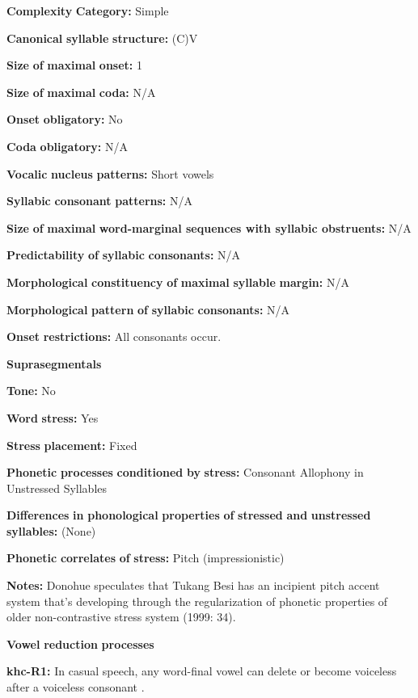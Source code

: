 \begin{styleBody}
\textbf{Complexity} \textbf{Category:} Simple

\textbf{Canonical} \textbf{syllable} \textbf{structure:} (C)V \citep[30-1]{Donohue1999}

\textbf{Size} \textbf{of} \textbf{maximal} \textbf{onset:} 1

\textbf{Size} \textbf{of} \textbf{maximal} \textbf{coda:} N/A

\textbf{Onset} \textbf{obligatory:} No

\textbf{Coda} \textbf{obligatory:} N/A

\textbf{Vocalic} \textbf{nucleus} \textbf{patterns:} Short vowels

\textbf{Syllabic} \textbf{consonant} \textbf{patterns:} N/A

\textbf{Size} \textbf{of} \textbf{maximal} \textbf{word{}-marginal sequences with syllabic obstruents:} N/A

\textbf{Predictability} \textbf{of} \textbf{syllabic} \textbf{consonants:} N/A

\textbf{Morphological} \textbf{constituency} \textbf{of} \textbf{maximal} \textbf{syllable} \textbf{margin:} N/A

\textbf{Morphological} \textbf{pattern} \textbf{of} \textbf{syllabic} \textbf{consonants:} N/A

\textbf{Onset} \textbf{restrictions:} All consonants occur.

\textbf{Suprasegmentals}

\textbf{Tone:} No

\textbf{Word} \textbf{stress:} Yes

\textbf{Stress} \textbf{placement:} Fixed

\textbf{Phonetic} \textbf{processes} \textbf{conditioned} \textbf{by} \textbf{stress:} Consonant Allophony in Unstressed Syllables

\textbf{Differences} \textbf{in} \textbf{phonological} \textbf{properties} \textbf{of} \textbf{stressed} \textbf{and} \textbf{unstressed} \textbf{syllables:} (None)

\textbf{Phonetic} \textbf{correlates} \textbf{of} \textbf{stress:} Pitch (impressionistic)

\textbf{Notes:} Donohue speculates that Tukang Besi has an incipient pitch accent system that’s developing through the regularization of phonetic properties of older non-contrastive stress system (1999: 34).

\textbf{Vowel} \textbf{reduction} \textbf{processes}

\textbf{khc-R1:} In casual speech, any word-final vowel can delete or become voiceless after a voiceless consonant \citep[23]{Donohue1999}.


\end{styleBody}
